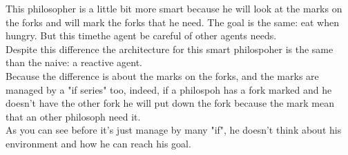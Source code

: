 This philosopher is a little bit more smart because he will look at the marks on the forks and will mark the forks that he need. The goal is the same: eat when hungry. But this timethe agent be careful of other agents needs.\\
Despite this difference the architecture for this smart philospoher is the same than the naive: a reactive agent.\\
Because the difference is about the marks on the forks, and the marks are managed by a "if series" too, indeed, if a philospoh has a fork marked and he doesn't have the other fork he will put down the fork because the mark mean that an other philosoph need it.\\
As you can see before it's just manage by many "if", he doesn't think about his environment and how he can reach his goal.